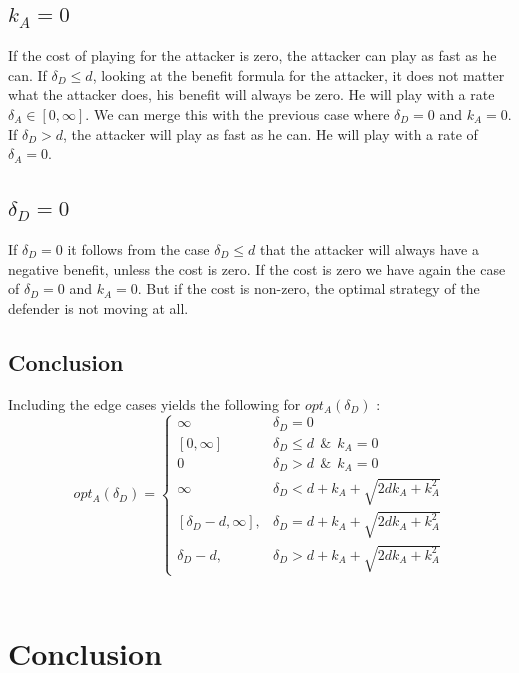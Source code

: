 \subsection*{$k_{A}=0$}
If the cost of playing for the attacker is zero, the attacker can play as fast as he can.  If $\delta_{D} \leq d$, looking at the benefit formula for the attacker, it does not matter what the attacker does, his benefit will always be zero. He will play with a rate $\delta_{A} \in [0,\infty ]$.  We can merge this with the previous case where $\delta_{D}=0$ and $k_{A}=0$.  If $\delta_{D} > d$, the attacker will play as fast as he can. He will play with a rate of $\delta_{A} =0$. 
\subsection*{$\delta_{D}=0$}
If $\delta_{D}=0$ it follows from the case $\delta_{D} \leq d$ that the attacker will always have a negative benefit, unless the cost is zero. If the cost is zero we have again the case of $\delta_{D}=0$ and $k_{A}=0$. But if the cost is non-zero, the optimal strategy of the defender is not moving at all. 

\subsection{Conclusion}
Including the edge cases yields the following for $opt_{A}(\delta_{D})$ : \\

 \begin{displaymath}
  opt_{A}(\delta_{D}) = \left\{
     \begin{array}{lr}
     \infty & \delta_{D} = 0 \\
     \left[0,\infty\right] & \delta_{D} \leq d ~~\& ~~k_{A}=0 \\
         0 & \delta_{D} > d ~~\& ~~k_{A}=0 \\
            \infty & \delta_{D} < d+k_{A} + \sqrt{2dk_{A}+k_{A}^{2}} \\
       \left[ \delta_{D}-d, \infty\right],  & \delta_{D} = d+k_{A} + \sqrt{2dk_{A}+k_{A}^{2}} \\
    	\delta_{D}-d, & \delta_{D} > d+k_{A} + \sqrt{2dk_{A}+k_{A}^{2}}
     \end{array}
   \right.
\end{displaymath}
\\

\section{Conclusion}

